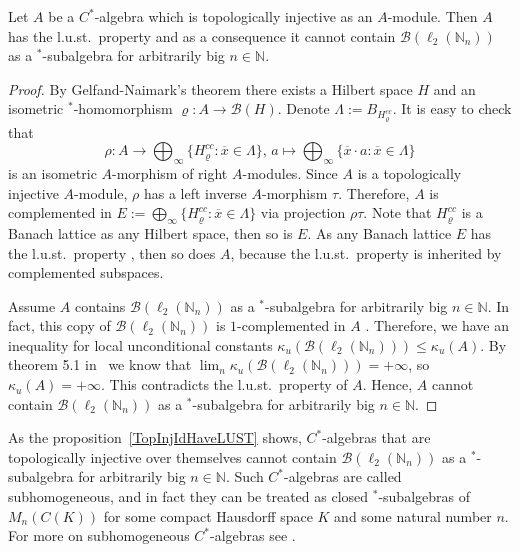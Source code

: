 \begin{proposition}\label{TopInjIdHaveLUST} Let $A$ be a $C^*$-algebra which is
topologically injective as an $A$-module. Then $A$ has the l.u.st.\ property and
as a consequence it cannot contain  $\mathcal{B}(\ell_2(\mathbb{N}_n))$ as a
${}^*$-subalgebra for arbitrarily big $n\in\mathbb{N}$.
\end{proposition}
\begin{proof} By Gelfand-Naimark's theorem \cite[theorem 4.7.57]{HelBanLocConvAlg} there exists a Hilbert space $H$ and an isometric ${}^*$-homomorphism
$\varrho:A\to\mathcal{B}(H)$. Denote $\Lambda:=B_{H_\varrho^{cc}}$. It is easy
to check that 
\[
\rho:
A
    \to
\bigoplus\nolimits_\infty \{H_\varrho^{cc}:\overline{x}\in \Lambda \},\, 
a
    \mapsto 
\bigoplus\nolimits_\infty \{\overline{x}\cdot a:\overline{x}\in \Lambda \}
\]
is an isometric $A$-morphism of right $A$-modules. Since $A$ is a topologically
injective $A$-module, $\rho$ has a left inverse $A$-morphism $\tau$.
Therefore, $A$ is complemented in $E:=\bigoplus_\infty
\{H_\varrho^{cc}:\overline{x}\in \Lambda \}$ via projection $\rho\tau$. Note
that $H_{\varrho}^{cc}$ is a Banach lattice as any Hilbert space, then so is
$E$. As any Banach lattice $E$ has the l.u.st.\ property \cite[theorem 17.1]{DiestAbsSumOps}, then so does $A$, because the l.u.st.\ property is inherited by
complemented subspaces.

Assume $A$ contains $\mathcal{B}(\ell_2(\mathbb{N}_n))$ as a ${}^*$-subalgebra for
arbitrarily big $n\in\mathbb{N}$. In fact, this copy of
$\mathcal{B}(\ell_2(\mathbb{N}_n))$ is $1$-complemented in $A$
\cite[lemma 2.1]{LauLoyWillisAmnblOfBanAndCStarAlgsOfLCG}. Therefore, we have
an inequality for local unconditional constants
$\kappa_u(\mathcal{B}(\ell_2(\mathbb{N}_n)))\leq \kappa_u(A)$. By theorem 5.1
in~\cite{GorLewAbsSmOpAndLocUncondStrct} we know that $\lim_n
\kappa_u(\mathcal{B}(\ell_2(\mathbb{N}_n)))=+\infty$, so $\kappa_u(A)=+\infty$.
This contradicts the l.u.st.\ property of $A$. Hence, $A$ cannot contain
$\mathcal{B}(\ell_2(\mathbb{N}_n))$ as a ${}^*$-subalgebra for arbitrarily big 
$n\in\mathbb{N}$.
\end{proof}

As the proposition~\ref{TopInjIdHaveLUST} shows, $C^*$-algebras that are
topologically injective over themselves cannot contain
$\mathcal{B}(\ell_2(\mathbb{N}_n))$ as a ${}^*$-subalgebra for arbitrarily big 
$n\in\mathbb{N}$. Such $C^*$-algebras are called subhomogeneous, and in fact
\cite[proposition IV.1.4.3]{BlackadarOpAlg} they can be treated as closed
${}^*$-subalgebras of $M_n(C(K))$ for some compact Hausdorff space $K$ and some
natural number $n$. For more on subhomogeneous $C^*$-algebras see
\cite[section IV.1.4]{BlackadarOpAlg}. 

